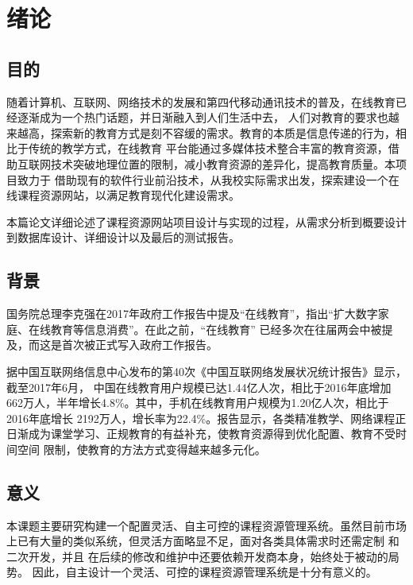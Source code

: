 \documentclass[titlepage,UTF8,linespread=1.5]{ctexart}
\begin{document}
\tableofcontents
\clearpage

\section{绪论}
\subsection{目的}
随着计算机、互联网、网络技术的发展和第四代移动通讯技术的普及，在线教育已经逐渐成为一个热门话题，并日渐融入到人们生活中去，
人们对教育的要求也越来越高，探索新的教育方式是刻不容缓的需求。教育的本质是信息传递的行为，相比于传统的教学方式，在线教育
平台能通过多媒体技术整合丰富的教育资源，借助互联网技术突破地理位置的限制，减小教育资源的差异化，提高教育质量。本项目致力于
借助现有的软件行业前沿技术，从我校实际需求出发，探索建设一个在线课程资源网站，以满足教育现代化建设需求。\par
本篇论文详细论述了课程资源网站项目设计与实现的过程，从需求分析到概要设计到数据库设计、详细设计以及最后的测试报告。\par
\subsection{背景}
国务院总理李克强在2017年政府工作报告\cite{2017政府工作报告}中提及“在线教育”，指出“扩大数字家庭、在线教育等信息消费”。在此之前，“在线教育”
已经多次在往届两会中被提及，而这是首次被正式写入政府工作报告。\par
据中国互联网络信息中心发布的第40次《中国互联网络发展状况统计报告》\cite{第40次中国互联网络发展状况统计报告}显示，截至2017年6月，
中国在线教育用户规模已达1.44亿人次，相比于2016年底增加662万人，半年增长4.8\%。其中，手机在线教育用户规模为1.20亿人次，相比于2016年底增长
2192万人，增长率为22.4\%。报告显示，各类精准教学、网络课程正日渐成为课堂学习、正规教育的有益补充，使教育资源得到优化配置、教育不受时间空间
限制，使教育的方法方式变得越来越多元化。\par
\subsection{意义}
本课题主要研究构建一个配置灵活、自主可控的课程资源管理系统。虽然目前市场上已有大量的类似系统，但灵活方面略显不足，面对各类具体需求时还需定制
和二次开发，并且 在后续的修改和维护中还要依赖开发商本身，始终处于被动的局势。 因此，自主设计一个灵活、可控的课程资源管理系统是十分有意义的。\par
\end{document}
